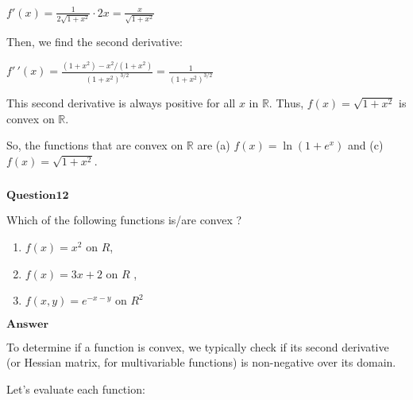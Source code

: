 \documentclass[11pt]{article}
\makeatletter
\newcommand{\boxspacing}{\kern\kvtcb@left@rule\kern\kvtcb@boxsep}
\newcommand{\prompt}[4]{
        {\ttfamily\llap{{\color{#2}[#3]:\hspace{3pt}#4}}\vspace{-\baselineskip}}
    }
\makeatother
\begin{document}
$ f'(x) = \frac{1}{2 \sqrt{1 + x^2}} \cdot 2x =
\frac{x}{\sqrt{1 + x^2}} $

Then, we find the second derivative:

$ f'\,'(x) = \frac{(1 + x^2) - x^2/(1 + x^2)}{(1 + x^2)^{3/2}} =
\frac{1}{(1 + x^2)^{3/2}} $

This second derivative is always positive for all $ x $ in $
\mathbb{R} $. Thus, $ f(x) = \sqrt{1+x^2} $ is convex on $
\mathbb{R} $.

So, the functions that are convex on $ \mathbb{R} $ are (a) $ f(x) =
\ln(1+e^x) $ and (c) $ f(x) = \sqrt{1+x^2} $.

    \begin{tcolorbox}[breakable, size=fbox, boxrule=1pt, pad at break*=1mm,colback=cellbackground, colframe=cellborder]
\prompt{In}{incolor}{ }{\boxspacing}
\begin{Verbatim}[commandchars=\\\{\}]

\end{Verbatim}
\end{tcolorbox}

    $\textbf{Question12}$

Which of the following functions is/are convex ?

\begin{enumerate}
\def\labelenumi{\alph{enumi}.}
\item
  $f(x)=x^2$ on $R$,
\item
  $f(x)=3x+2$ on $R$ ,
\item
  $f(x,y)=e^{-x-y}$ on $R^2$
\end{enumerate}

$\textbf{Answer}$

    To determine if a function is convex, we typically check if its second
derivative (or Hessian matrix, for multivariable functions) is
non-negative over its domain.

Let's evaluate each function:
\end{document}
